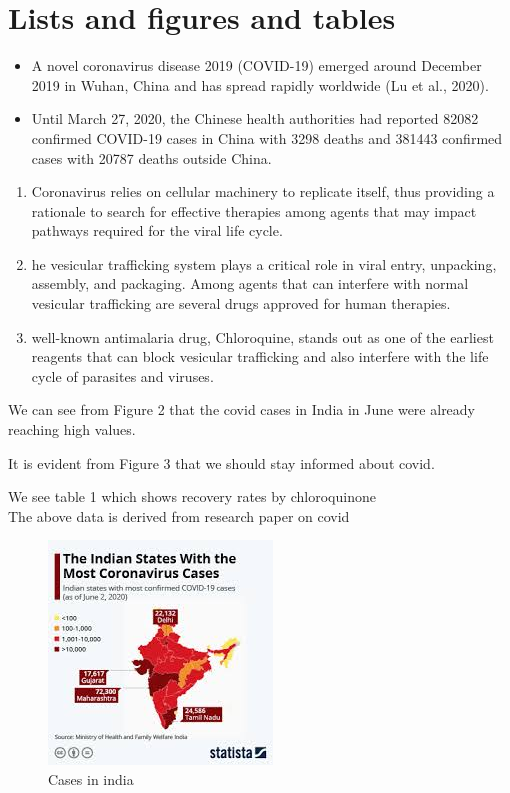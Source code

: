 \documentclass{article}
\begin{document}
\section{Lists and figures and tables}
\begin{itemize}
\item A novel coronavirus disease 2019 (COVID-19) emerged around December 2019 in Wuhan, China and has spread rapidly worldwide (Lu et al., 2020).
\item Until March 27, 2020, the Chinese health authorities had reported 82082 confirmed COVID-19 cases in China with 3298 deaths and 381443 confirmed cases with 20787 deaths outside China.
\end{itemize}
\begin{enumerate}
\item Coronavirus relies on cellular machinery to replicate itself, thus providing a rationale to search for effective therapies among agents that may impact pathways required for the viral life cycle.
\item he vesicular trafficking system plays a critical role in viral entry, unpacking, assembly, and packaging. Among agents that can interfere with normal vesicular trafficking are several drugs approved for human therapies.
\item well-known antimalaria drug, Chloroquine, stands out as one of the earliest reagents that can block vesicular trafficking and also interfere with the life cycle of parasites and viruses.
\end{enumerate}\par
We can see from Figure 2 that the covid cases in India in June were already reaching high values.\\\par
It is evident from Figure 3 that we should stay informed about covid.\\\par
We see table 1 which shows recovery rates by chloroquinone\\
The above data is derived from research paper on covid\cite{huang2020treating}
\newpage
\newpage
\begin{figure}
\centering
\includegraphics[scale=1]{c19.jpg}
\caption{Cases in india}
\end{figure}
\end{document}
